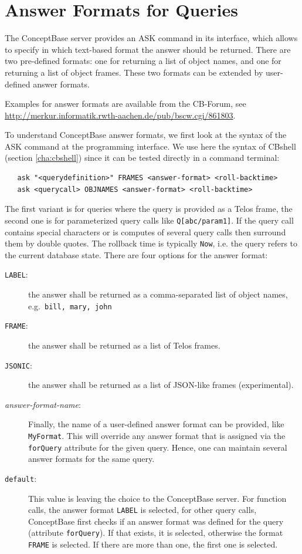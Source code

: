 \chapter{Answer Formats for Queries}
\label{sec:answerformat}

The ConceptBase server provides an ASK command in its interface, which
allows to specify in which text-based format the answer should be returned. There
are two pre-defined formats: one for returning a list of object names,
and one for returning a list of object frames. These two formats can
be extended by user-defined answer formats.


Examples for answer formats are available from the CB-Forum,
see \url{http://merkur.informatik.rwth-aachen.de/pub/bscw.cgi/861803}.

To understand ConceptBase answer formats, we first look at
the syntax of the ASK command at the programming interface. We use here the syntax
of CBshell (section \ref{cha:cbshell}) since it can be tested directly in a command terminal:

\begin{verbatim}
   ask "<querydefinition>" FRAMES <answer-format> <roll-backtime>
   ask <querycall> OBJNAMES <answer-format> <roll-backtime>
\end{verbatim}

The first variant is for queries where the query is provided
as a Telos frame, the second one
is for parameterized query calls like {\tt Q[abc/param1]}.
If the query call contains special characters or is computes of several query calls
then surround them by double quotes. The rollback time is
typically {\tt Now}, i.e. the query refers to the current database state.
There are four options for the answer format:

\begin{description}
\item[{\tt LABEL}:]
      the answer shall be returned as a comma-separated list of object names, e.g.\ 
      {\tt bill, mary, john}
\item[{\tt FRAME}:]
      the answer shall be returned as a list of Telos frames. 
\item[{\tt JSONIC}:]
      the answer shall be returned as a list of JSON-like frames (experimental).
\item[{\em answer-format-name}:]
      Finally, the name of a user-defined answer format can be provided, like {\tt MyFormat}.
      This will override any answer format that is assigned via the {\tt forQuery} attribute
      for the given query. Hence, one can maintain several answer formats for the same query.
\item[{\tt default}:]
      This value is leaving the choice to the ConceptBase server. For function
      calls, the answer format {\tt LABEL} is selected, for other query calls,
      ConceptBase first checks if an answer format was defined for the query (attribute {\tt forQuery}).
      If that exists, it is selected, otherwise the format
      {\tt FRAME} is selected. If there are more than one,
      the first one is selected.
\end{description}

